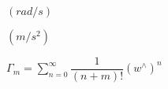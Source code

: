 \documentclass{article}
\begin{document}
$(rad/s)$
\pagebreak

$(m/s^2)$
\pagebreak

$ \Gamma_m = \sum_{n=0}^{\infty} \dfrac{1}{(n+m)!} (w^\wedge)^n $
\pagebreak
\end{document}

